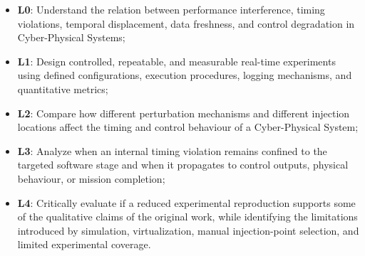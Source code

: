 \begin{itemize}[nosep]
    \item \textbf{L0}: Understand the relation between performance interference, timing violations, temporal displacement, data freshness, and control degradation in Cyber-Physical Systems;
    \item \textbf{L1}: Design controlled, repeatable, and measurable real-time experiments using defined configurations, execution procedures, logging mechanisms, and quantitative metrics;
    \item \textbf{L2}: Compare how different perturbation mechanisms and different injection locations affect the timing and control behaviour of a Cyber-Physical System;
    \item \textbf{L3}: Analyze when an internal timing violation remains confined to the targeted software stage and when it propagates to control outputs, physical behaviour, or mission completion;
    \item \textbf{L4}: Critically evaluate if a reduced experimental reproduction supports some of the qualitative claims of the original work, while identifying the limitations introduced by simulation, virtualization, manual injection-point selection, and limited experimental coverage.
\end{itemize}

